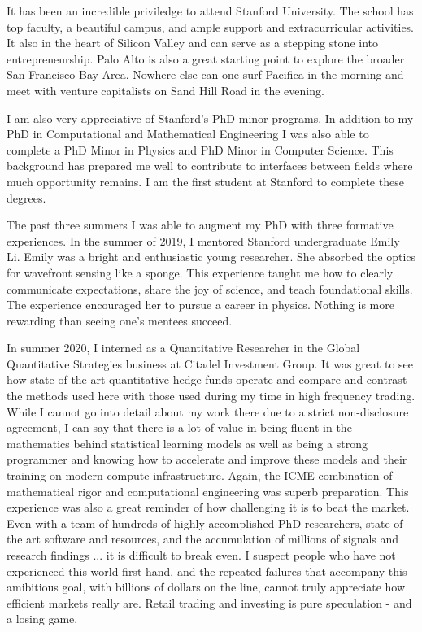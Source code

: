 It has been an incredible priviledge to attend Stanford University. The school has top faculty, a beautiful campus, and ample support and extracurricular activities. It also in the heart of Silicon Valley and can serve as a stepping stone into entrepreneurship. Palo Alto is also a great starting point to explore the broader San Francisco Bay Area. Nowhere else can one surf Pacifica in the morning and meet with venture capitalists on Sand Hill Road in the evening.

I am also very appreciative of Stanford's PhD minor programs. In addition to my PhD in Computational and Mathematical Engineering I was also able to complete a PhD Minor in Physics and PhD Minor in Computer Science. This background has prepared me well to contribute to interfaces between fields where much opportunity remains. I am the first student at Stanford to complete these degrees. 

The past three summers I was able to augment my PhD with three formative experiences. In the summer of 2019, I mentored Stanford undergraduate Emily Li. Emily was a bright and enthusiastic young researcher. She absorbed the optics for wavefront sensing like a sponge. This experience taught me how to clearly communicate expectations, share the joy of science, and teach foundational skills. The experience encouraged her to pursue a career in physics. Nothing is more rewarding than seeing one's mentees succeed.  

In summer 2020, I interned as a Quantitative Researcher in the Global Quantitative Strategies business at Citadel Investment Group. It was great to see how state of the art quantitative hedge funds operate and compare and contrast the methods used here with those used during my time in high frequency trading. While I cannot go into detail about my work there due to a strict non-disclosure agreement, I can say that there is a lot of value in being fluent in the mathematics behind statistical learning models as well as being a strong programmer and knowing how to accelerate and improve these models and their training on modern compute infrastructure. Again, the ICME combination of mathematical rigor and computational engineering was superb preparation. This experience was also a great reminder of how challenging it is to beat the market. Even with a team of hundreds of highly accomplished PhD researchers, state of the art software and resources, and the accumulation of millions of signals and research findings ... it is difficult to break even. I suspect people who have not experienced this world first hand, and the repeated failures that accompany this amibitious goal, with billions of dollars on the line, cannot truly appreciate how efficient markets really are. Retail trading and investing is pure speculation - and a losing game. 

